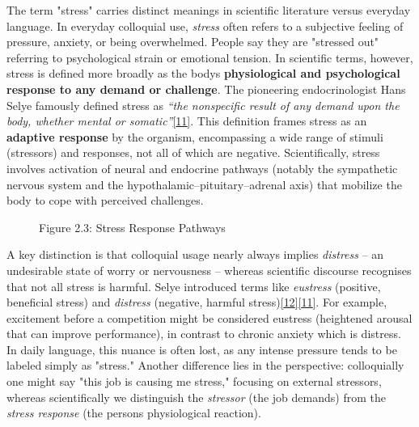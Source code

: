 \documentclass[12pt,a4paper]{article}
\begin{document}
The term "stress" carries distinct meanings in scientific literature versus everyday language. In everyday colloquial use, \emph{stress} often refers to a subjective feeling of pressure, anxiety, or being overwhelmed. People say they are "stressed out" referring to psychological strain or emotional tension. In scientific terms, however, stress is defined more broadly as the body\textquotesingle s \textbf{physiological and psychological response to any demand or challenge}. The pioneering endocrinologist Hans Selye famously defined stress as \emph{``the nonspecific result of any demand upon the body, whether mental or somatic''}\href{Selye1956}{{[}11{]}}. This definition frames stress as an \textbf{adaptive response} by the organism, encompassing a wide range of stimuli (stressors) and responses, not all of which are negative. Scientifically, stress involves activation of neural and endocrine pathways (notably the sympathetic nervous system and the hypothalamic--pituitary--adrenal axis) that mobilize the body to cope with perceived challenges.

\begin{figure}
\centering
{}
\caption{Figure 2.3: Stress Response Pathways}
\end{figure}

A key distinction is that colloquial usage nearly always implies \emph{distress} -- an undesirable state of worry or nervousness -- whereas scientific discourse recognises that not all stress is harmful. Selye introduced terms like \emph{eustress} (positive, beneficial stress) and \emph{distress} (negative, harmful stress)\href{Selye1974}{{[}12{]}}\href{Selye1956}{{[}11{]}}. For example, excitement before a competition might be considered eustress (heightened arousal that can improve performance), in contrast to chronic anxiety which is distress. In daily language, this nuance is often lost, as any intense pressure tends to be labeled simply as "stress." Another difference lies in the perspective: colloquially one might say "this job is causing me stress," focusing on external stressors, whereas scientifically we distinguish the \emph{stressor} (the job demands) from the \emph{stress response} (the person\textquotesingle s physiological reaction).
\end{document}
